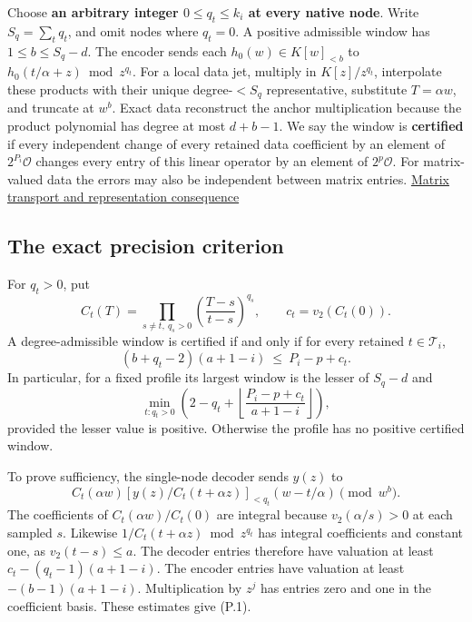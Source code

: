 \documentclass[
  11pt,
]{article}
\begin{document}
Choose \textbf{an arbitrary integer \(0\le q_t\le k_i\) at every native
node}. Write \(S_q=\sum_tq_t\), and omit nodes where \(q_t=0\). A
positive admissible window has \(1\le b\le S_q-d\). The encoder sends
each \(h_0(w)\in K[w]_{<b}\) to \(h_0(t/\alpha+z)\bmod z^{q_t}\). For a
local data jet, multiply in \(K[z]/z^{q_t}\), interpolate these products
with their unique degree-\(<S_q\) representative, substitute
\(T=\alpha w\), and truncate at \(w^b\). Exact data reconstruct the
anchor multiplication because the product polynomial has degree at most
\(d+b-1\). We say the window is \textbf{certified} if every independent
change of every retained data coefficient by an element of
\(2^{P_i}\mathcal O\) changes every entry of this linear operator by an
element of \(2^p\mathcal O\). For matrix-valued data the errors may also
be independent between matrix entries.
\href{https://github.com/dch-and-Elara/some-research-inspired-by-openais-eth-preprint/tree/main/rank-budget-barriers}{Matrix transport and representation
consequence}

\subsection{The exact precision
criterion}\label{the-exact-precision-criterion}

For \(q_t>0\), put \[
 C_t(T)=\prod_{s\ne t,\ q_s>0}
       \left(\frac{T-s}{t-s}\right)^{q_s},\qquad c_t=v_2(C_t(0)).
\] A degree-admissible window is certified if and only if for every
retained \(t\in\mathcal T_i\), \[
       (b+q_t-2)(a+1-i)\ \le\ P_i-p+c_t.                 \tag{P.1}
\] In particular, for a fixed profile its largest window is the lesser
of \(S_q-d\) and \[
 \min_{t:q_t>0}\left(2-q_t+
 \left\lfloor\frac{P_i-p+c_t}{a+1-i}\right\rfloor\right),
                                                               \tag{P.2}
\] provided the lesser value is positive. Otherwise the profile has no
positive certified window.

To prove sufficiency, the single-node decoder sends \(y(z)\) to \[
 C_t(\alpha w)
 \left[ y(z)/C_t(t+\alpha z)\right]_{<q_t}
     (w-t/\alpha)\pmod{w^b}.
\] The coefficients of \(C_t(\alpha w)/C_t(0)\) are integral because
\(v_2(\alpha/s)>0\) at each sampled \(s\). Likewise
\(1/C_t(t+\alpha z)\bmod z^{q_t}\) has integral coefficients and
constant one, as \(v_2(t-s)\le a\). The decoder entries therefore have
valuation at least \(c_t-(q_t-1)(a+1-i)\). The encoder entries have
valuation at least \(-(b-1)(a+1-i)\). Multiplication by \(z^j\) has
entries zero and one in the coefficient basis. These estimates give
(P.1).
\end{document}
